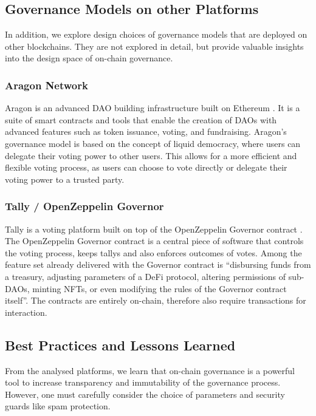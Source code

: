 \documentclass[11pt]{article}
\begin{document}
\subsection{Governance Models on other Platforms}

In addition, we explore design choices of governance models that are deployed on other blockchains.
They are not explored in detail, but provide valuable insights into the design space of on-chain governance.

\subsubsection{Aragon Network}

Aragon is an advanced DAO building infrastructure built on Ethereum \cite{aragon}.
It is a suite of smart contracts and tools that enable the creation of DAOs with advanced features such as token issuance, voting, and fundraising.
Aragon's governance model is based on the concept of liquid democracy, where users can delegate their voting power to other users.
This allows for a more efficient and flexible voting process, as users can choose to vote directly or delegate their voting power to a trusted party.

\subsubsection{Tally / OpenZeppelin Governor}

Tally is a voting platform built on top of the OpenZeppelin Governor contract \cite{Tally, OpenZeppelin}.
The OpenZeppelin Governor contract is a central piece of software that controls the voting process, keeps tallys and also enforces outcomes of votes.
Among the feature set already delivered with the Governor contract is ``disbursing funds from a treasury, adjusting parameters of a DeFi protocol, altering permissions of sub-DAOs, minting NFTs, or even modifying the rules of the Governor contract itself''.
The contracts are entirely on-chain, therefore also require transactions for interaction.

\subsection{Best Practices and Lessons Learned}

From the analysed platforms, we learn that on-chain governance is a powerful tool to increase transparency and immutability of the governance process.
However, one must carefully consider the choice of parameters and security guards like spam protection.
\end{document}
